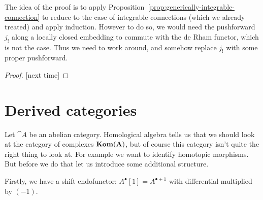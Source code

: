 \documentclass[number-in-sections,a4paper]{notes}
\begin{document}
The idea of the proof is to apply Proposition~\ref{prop:generically-integrable-connection} to reduce to the case of integrable connections (which we already treated) and apply induction.
However to do so, we would need the pushforward $j_!$ along a locally closed embedding to commute with the de Rham functor, which is not the case.
Thus we need to work around, and somehow replace $j_!$ with some proper pushforward.

\begin{proof}{}
    [next time]
\end{proof}

\iffalse

\section{Regularity}

\begin{itemize}
    \item Definition
    \item Preserved by functors
\end{itemize}

\section{Riemann--Hilbert correspondence}

\begin{itemize}
    \item Statement
    \item Outline of proof in the algebraic setting
    \item Perverse sheaves
\end{itemize}

\fi
\appendix

\section{Derived categories}
Let $\cat A$ be an abelian category.
Homological algebra tells us that we should look at the category of complexes $\mathbf{Kom}(\mathbf A)$, but of course this category isn't quite the right thing to look at.
For example we want to identify homotopic morphisms.
But before we do that let us introduce some additional structure.

Firstly, we have a shift endofunctor: $A^\bullet[1] = A^{\bullet + 1}$ with differential multiplied by $(-1)$.
\end{document}
